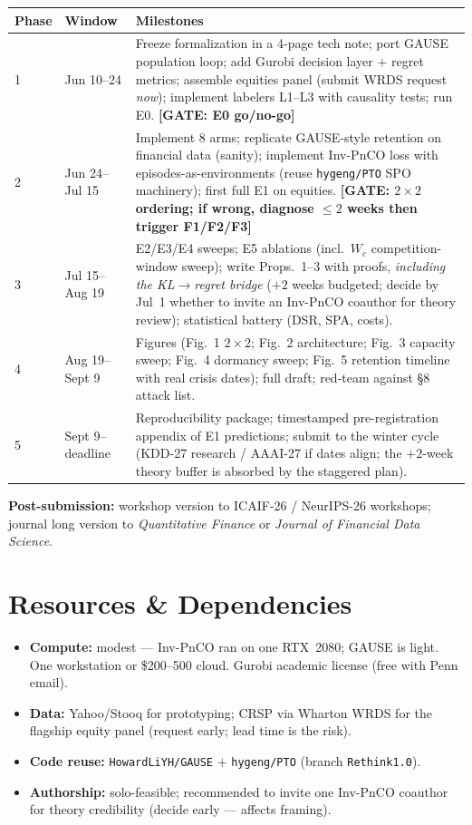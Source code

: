 \documentclass[11pt]{article}
\newcommand{\gate}[1]{\textcolor{red!70!black}{\textbf{[GATE: #1]}}}
\begin{document}
\begin{center}\small
\begin{tabular}{@{}llp{9.2cm}@{}}
\toprule
Phase & Window & Milestones\\
\midrule
1 & Jun 10--24 & Freeze formalization in a 4-page tech note; port GAUSE population loop; add Gurobi decision layer $+$ regret metrics; assemble equities panel (submit WRDS request \emph{now}); implement labelers L1--L3 with causality tests; run E0. \gate{E0 go/no-go}\\
2 & Jun 24--Jul 15 & Implement 8 arms; replicate GAUSE-style retention on financial data (sanity); implement Inv-PnCO loss with episodes-as-environments (reuse \texttt{hygeng/PTO} SPO machinery); first full E1 on equities. \gate{$2\times2$ ordering; if wrong, diagnose $\le 2$ weeks then trigger F1/F2/F3}\\
3 & Jul 15--Aug 19 & E2/E3/E4 sweeps; E5 ablations (incl.\ $W_c$ competition-window sweep); write Props.~1--3 with proofs, \emph{including the KL$\to$regret bridge} ($+2$ weeks budgeted; decide by Jul~1 whether to invite an Inv-PnCO coauthor for theory review); statistical battery (DSR, SPA, costs).\\
4 & Aug 19--Sept 9 & Figures (Fig.~1 $2\times2$; Fig.~2 architecture; Fig.~3 capacity sweep; Fig.~4 dormancy sweep; Fig.~5 retention timeline with real crisis dates); full draft; red-team against \S8 attack list.\\
5 & Sept 9--deadline & Reproducibility package; timestamped pre-registration appendix of E1 predictions; submit to the winter cycle (KDD-27 research / AAAI-27 if dates align; the $+2$-week theory buffer is absorbed by the staggered plan).\\
\bottomrule
\end{tabular}
\end{center}

\noindent\textbf{Post-submission:} workshop version to ICAIF-26 / NeurIPS-26 workshops; journal long version to \emph{Quantitative Finance} or \emph{Journal of Financial Data Science}.

\section{Resources \& Dependencies}
\begin{itemize}
  \item \textbf{Compute:} modest --- Inv-PnCO ran on one RTX~2080; GAUSE is light. One workstation or \$200--500 cloud. Gurobi academic license (free with Penn email).
  \item \textbf{Data:} Yahoo/Stooq for prototyping; CRSP via Wharton WRDS for the flagship equity panel (request early; lead time is the risk).
  \item \textbf{Code reuse:} \texttt{HowardLiYH/GAUSE} $+$ \texttt{hygeng/PTO} (branch \texttt{Rethink1.0}).
  \item \textbf{Authorship:} solo-feasible; recommended to invite one Inv-PnCO coauthor for theory credibility (decide early --- affects framing).
\end{itemize}
\end{document}
